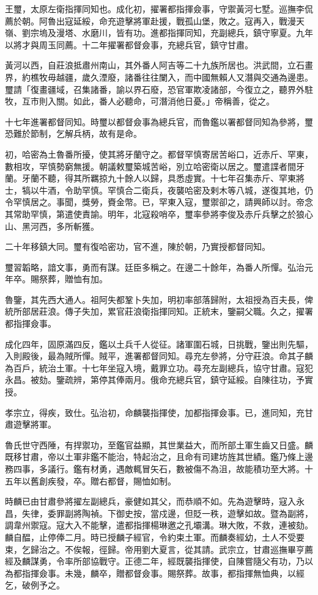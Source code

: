 \begin{pinyinscope}
王璽，太原左衛指揮同知也。成化初，擢署都指揮僉事，守禦黃河七墅。巡撫李侃薦於朝。阿魯出寇延綏，命充遊擊將軍赴援，戰孤山堡，敗之。寇再入，戰漫天嶺、劉宗塢及漫塔、水磨川，皆有功。進都指揮同知，充副總兵，鎮守寧夏。九年以將才與周玉同薦。十二年擢署都督僉事，充總兵官，鎮守甘肅。

黃河以西，自莊浪抵肅州南山，其外番人阿吉等二十九族所居也。洪武間，立石畫界，約樵牧毋越疆，歲久湮廢，諸番往往闌入，而中國無賴人又潛與交通為邊患。璽請「復畫疆域，召集諸番，諭以界石廢，恐官軍欺凌諸部，今復立之，聽界外駐牧，互市則入關。如此，番人必聽命，可潛消他日憂。」帝稱善，從之。

十七年進署都督同知。時璽以都督僉事為總兵官，而魯鑑以署都督同知為參將，璽恐難於節制，乞解兵柄，故有是命。

初，哈密為土魯番所擾，使其將牙蘭守之。都督罕慎寄居苦峪口，近赤斤、罕東，數相攻，罕慎勢窮無援。朝議敕璽築城苦峪，別立哈密衛以居之。璽遣諜者間牙蘭。牙蘭不聽，得其所羈掠九十餘人以歸，具悉虛實。十七年召集赤斤、罕東將士，犒以牛酒，令助罕慎。罕慎合二衛兵，夜襲哈密及剌木等八城，遂復其地，仍令罕慎居之。事聞，獎勞，賚金幣。已，罕東入寇，璽禦卻之，請興師以討。帝念其常助罕慎，第遣使責諭。明年，北寇殺哨卒，璽率參將李俊及赤斤兵擊之於狼心山、黑河西，多所斬獲。

二十年移鎮大同。璽有復哈密功，官不進，陳於朝，乃實授都督同知。

璽習韜略，諳文事，勇而有謀。廷臣多稱之。在邊二十餘年，為番人所憚。弘治元年卒。賜祭葬，贈恤有加。

魯鑒，其先西大通人。祖阿失都鞏卜失加，明初率部落歸附，太祖授為百夫長，俾統所部居莊浪。傳子失加，累官莊浪衛指揮同知。正統末，鑒嗣父職。久之，擢署都指揮僉事。

成化四年，固原滿四反，鑑以土兵千人從征。諸軍圍石城，日挑戰，鑒出則先驅，入則殿後，最為賊所憚。賊平，進署都督同知。尋充左參將，分守莊浪。命其子麟為百戶，統治土軍。十七年坐寇入境，戴罪立功。尋充左副總兵，協守甘肅。寇犯永昌。被劾。鑒疏辨，第停其俸兩月。俄命充總兵官，鎮守延綏。自陳往功，予實授。

孝宗立，得疾，致仕。弘治初，命麟襲指揮使，加都指揮僉事。已，進同知，充甘肅遊擊將軍。

魯氏世守西陲，有捍禦功，至鑑官益顯，其世業益大，而所部土軍生齒又日盛。麟既移甘肅，帝以土軍非鑑不能治，特起治之，且命有司建坊旌其世績。鑑乃條上邊務四事，多議行。鑑有材勇，遇敵輒冒矢石，數被傷不為沮，故能積功至大將。十五年以舊創疾發，卒。贈右都督，賜恤如制。

時麟已由甘肅參將擢左副總兵，豪健如其父，而恭順不如。先為遊擊時，寇入永昌，失律，委罪副將陶禎。下御史按，當戍邊，但貶一秩，遊擊如故。暨為副將，調韋州禦寇。寇大入不能擊，遣都指揮楊琳邀之孔壩溝。琳大敗，不救，連被劾。麟自醖，止停俸二月。時已授麟子經官，令約束土軍。而麟奏經幼，土人不受要束，乞歸治之。不俟報，徑歸。帝用劉大夏言，從其請。武宗立，甘肅巡撫畢亨薦經及麟謀勇，令率所部協戰守。正德二年，經既襲指揮使，自陳嘗隨父有功，乃以為都指揮僉事。未幾，麟卒，贈都督僉事。賜祭葬。故事，都指揮無恤典，以經乞，破例予之。


\end{pinyinscope}
